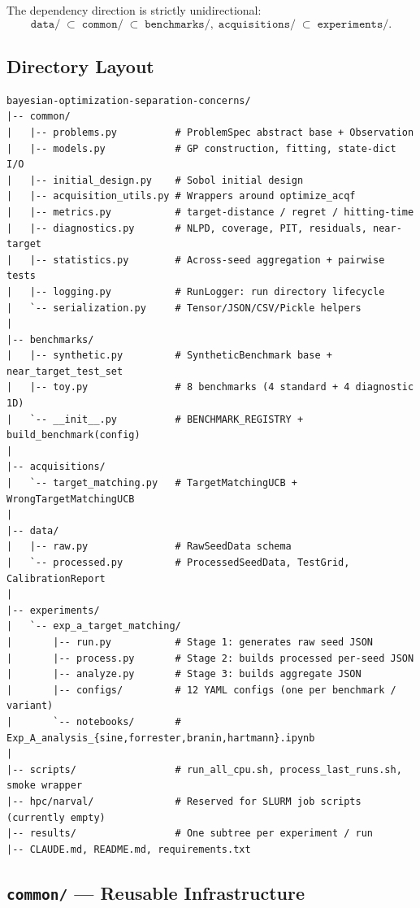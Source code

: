 \documentclass[11pt]{article}
\begin{document}
The dependency direction is strictly unidirectional:
\[
  \texttt{data/}
  \;\subset\;
  \texttt{common/}
  \;\subset\;
  \texttt{benchmarks/},\;\texttt{acquisitions/}
  \;\subset\;
  \texttt{experiments/}.
\]
 
\subsection{Directory Layout}
 
\begin{lstlisting}
bayesian-optimization-separation-concerns/
|-- common/
|   |-- problems.py          # ProblemSpec abstract base + Observation
|   |-- models.py            # GP construction, fitting, state-dict I/O
|   |-- initial_design.py    # Sobol initial design
|   |-- acquisition_utils.py # Wrappers around optimize_acqf
|   |-- metrics.py           # target-distance / regret / hitting-time
|   |-- diagnostics.py       # NLPD, coverage, PIT, residuals, near-target
|   |-- statistics.py        # Across-seed aggregation + pairwise tests
|   |-- logging.py           # RunLogger: run directory lifecycle
|   `-- serialization.py     # Tensor/JSON/CSV/Pickle helpers
|
|-- benchmarks/
|   |-- synthetic.py         # SyntheticBenchmark base + near_target_test_set
|   |-- toy.py               # 8 benchmarks (4 standard + 4 diagnostic 1D)
|   `-- __init__.py          # BENCHMARK_REGISTRY + build_benchmark(config)
|
|-- acquisitions/
|   `-- target_matching.py   # TargetMatchingUCB + WrongTargetMatchingUCB
|
|-- data/
|   |-- raw.py               # RawSeedData schema
|   `-- processed.py         # ProcessedSeedData, TestGrid, CalibrationReport
|
|-- experiments/
|   `-- exp_a_target_matching/
|       |-- run.py           # Stage 1: generates raw seed JSON
|       |-- process.py       # Stage 2: builds processed per-seed JSON
|       |-- analyze.py       # Stage 3: builds aggregate JSON
|       |-- configs/         # 12 YAML configs (one per benchmark / variant)
|       `-- notebooks/       # Exp_A_analysis_{sine,forrester,branin,hartmann}.ipynb
|
|-- scripts/                 # run_all_cpu.sh, process_last_runs.sh, smoke wrapper
|-- hpc/narval/              # Reserved for SLURM job scripts (currently empty)
|-- results/                 # One subtree per experiment / run
|-- CLAUDE.md, README.md, requirements.txt
\end{lstlisting}
 
\subsection{\texttt{common/} --- Reusable Infrastructure}
 
\end{document}
